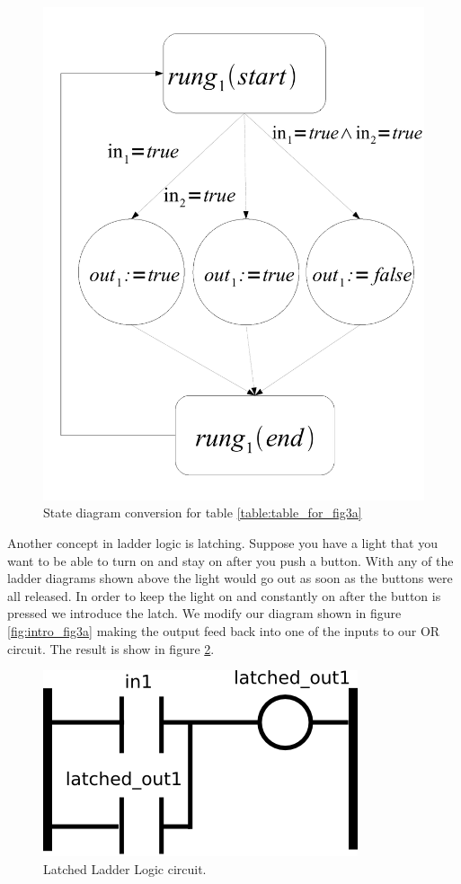 \begin{figure}[h]
    \centering
    \includegraphics[width=\imgmedsmall]{./images/intro_or_graph_3a.pdf} %
    \caption{State diagram conversion for table \ref{table:table_for_fig3a}}
    \label{fig:intro_or_graph_3a}
\end{figure}

Another concept in ladder logic is latching. Suppose you have a light that you want to be able to turn on and stay on after you push a button. With any of the ladder diagrams shown above the light would go out as soon as the buttons were all released. In order to keep the light on and constantly on after the button is pressed we introduce the latch. We modify our diagram shown in figure \ref{fig:intro_fig3a} making the output feed back into one of the inputs to our OR circuit. The result is show in figure \ref{fig:intro_fig_latched}.

\begin{figure}[h]
    \centering
    \includegraphics[width=\imgsmall]{./images/intro_fig_latched.png} 
    \caption{Latched Ladder Logic circuit.}
    \label{fig:intro_fig_latched}
\end{figure}


